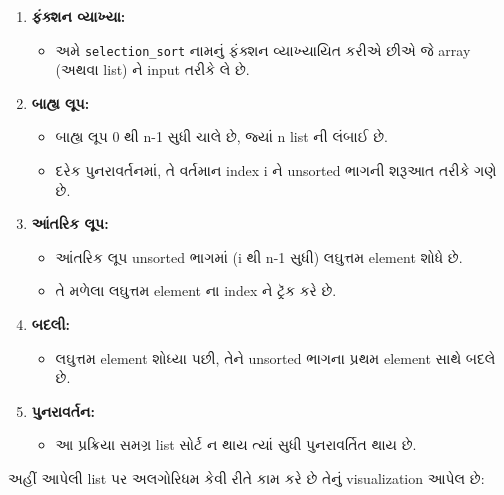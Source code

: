 \begin{enumerate}
\def\labelenumi{\arabic{enumi}.}
\tightlist
\item
  \textbf{ફંક્શન વ્યાખ્યા:}

  \begin{itemize}
  \tightlist
  \item
    અમે \texttt{selection\_sort} નામનું ફંક્શન વ્યાખ્યાયિત કરીએ છીએ જે array
    (અથવા list) ને input તરીકે લે છે.
  \end{itemize}
\item
  \textbf{બાહ્ય લૂપ:}

  \begin{itemize}
  \tightlist
  \item
    બાહ્ય લૂપ 0 થી n-1 સુધી ચાલે છે, જ્યાં n list ની લંબાઈ છે.
  \item
    દરેક પુનરાવર્તનમાં, તે વર્તમાન index i ને unsorted ભાગની શરૂઆત તરીકે ગણે છે.
  \end{itemize}
\item
  \textbf{આંતરિક લૂપ:}

  \begin{itemize}
  \tightlist
  \item
    આંતરિક લૂપ unsorted ભાગમાં (i થી n-1 સુધી) લઘુત્તમ element શોધે છે.
  \item
    તે મળેલા લઘુત્તમ element ના index ને ટ્રૅક કરે છે.
  \end{itemize}
\item
  \textbf{બદલી:}

  \begin{itemize}
  \tightlist
  \item
    લઘુત્તમ element શોધ્યા પછી, તેને unsorted ભાગના પ્રથમ element સાથે બદલે છે.
  \end{itemize}
\item
  \textbf{પુનરાવર્તન:}

  \begin{itemize}
  \tightlist
  \item
    આ પ્રક્રિયા સમગ્ર list સોર્ટ ન થાય ત્યાં સુધી પુનરાવર્તિત થાય છે.
  \end{itemize}
\end{enumerate}

અહીં આપેલી list પર અલગોરિધમ કેવી રીતે કામ કરે છે તેનું visualization આપેલ છે:

